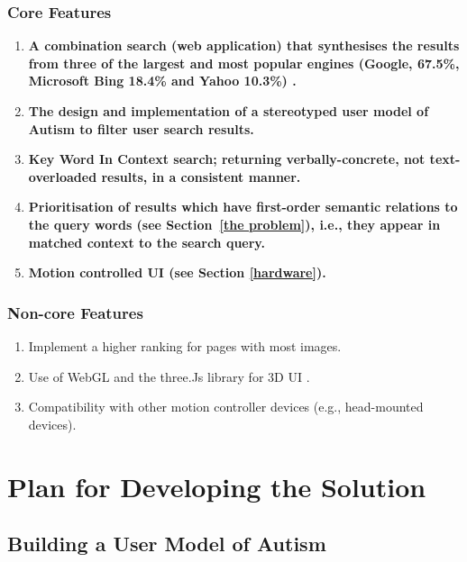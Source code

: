 \documentclass[a4paper, 10pt]{article}
\begin{document}
\subsubsection{Core Features}\label{core}
\begin{enumerate}
\item  \textbf{A combination search (web application) that synthesises the results from three of the largest and most popular engines (Google, 67.5\%, Microsoft Bing 18.4\% and Yahoo 10.3\%) \cite{adam}.}

\item \textbf{The design and implementation of a stereotyped user model of Autism to filter user search results.}

\item \textbf{Key Word In Context search; returning verbally-concrete, not text-overloaded results, in a consistent manner. }

\item \textbf{Prioritisation of results which have first-order semantic relations to the query words (see Section~\ref{the problem}), i.e., they appear in matched context to the search query.}

\item \textbf{Motion controlled UI (see Section \ref{hardware}).}
\end{enumerate}

\subsubsection{Non-core Features}
\begin{enumerate}

\item Implement a higher ranking for pages with most images. 
\item Use of WebGL and the three.Js library for 3D UI .
\item Compatibility with other motion controller devices (e.g., head-mounted devices).

\end{enumerate}

\section{Plan for Developing the Solution}

\subsection {Building a User Model of Autism}\label{usermodel}
\end{document}
